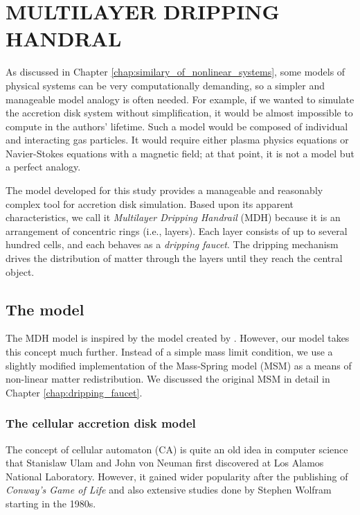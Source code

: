 \chapter{MULTILAYER DRIPPING HANDRAL}
    \label{chap:multilayer_dripping_handrail}
    \thispagestyle{empty}

    As discussed in Chapter \ref{chap:similary_of_nonlinear_systems}, some models of physical systems can be very computationally demanding, so a simpler and manageable model analogy is often needed. For example, if we wanted to simulate the accretion disk system without simplification, it would be almost impossible to compute in the authors' lifetime. Such a model would be composed of individual and interacting gas particles. It would require either plasma physics equations or Navier-Stokes equations with a magnetic field; at that point, it is not a model but a perfect analogy. 

    The model developed for this study provides a manageable and reasonably complex tool for accretion disk simulation. Based upon its apparent characteristics, we call it \emph{Multilayer Dripping Handrail} (MDH) because it is an arrangement of concentric rings (i.e., layers). Each layer consists of up to several hundred cells, and each behaves as a \emph{dripping faucet}. The dripping mechanism drives the distribution of matter through the layers until they reach the central object.

\section{The model}
    The MDH model is inspired by the model created by \cite{yonehara1997}. However, our model takes this concept much further. Instead of a simple mass limit condition, we use a slightly modified implementation of the Mass-Spring model (MSM) as a means of non-linear matter redistribution. We discussed the original MSM in detail in Chapter \ref{chap:dripping_faucet}. 

\subsection{The cellular accretion disk model}
    The concept of cellular automaton (CA) is quite an old idea in computer science that Stanislaw Ulam and John von Neuman first discovered at Los Alamos National Laboratory. However, it gained wider popularity after the publishing of \emph{Conway's Game of Life} \cite{gardner1970} and also extensive studies done by Stephen Wolfram starting in the 1980s.

